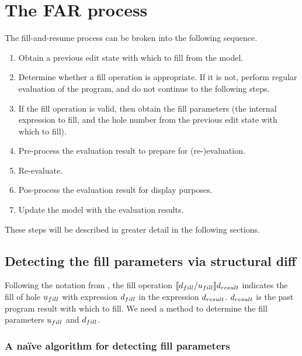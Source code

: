 \section{The FAR process}
\label{sec:far-process}

The fill-and-resume process can be broken into the following sequence.

\begin{enumerate}
\item Obtain a previous edit state with which to fill from the model.
\item Determine whether a fill operation is appropriate. If it is not, perform regular evaluation of the program, and do not continue to the following steps.
\item If the fill operation is valid, then obtain the fill parameters (the internal expression to fill, and the hole number from the previous edit state with which to fill).
\item Pre-process the evaluation result to prepare for (re-)evaluation.
\item Re-evaluate.
\item Pos-process the evaluation result for display purposes.
\item Update the model with the evaluation results.
\end{enumerate}

These steps will be described in greater detail in the following sections.

\subsection{Detecting the fill parameters via structural diff}
\label{sec:obtaining-fill-parameters}

Following the notation from \cite{conf/popl/HazelnutLive19}, the fill operation $\llbracket{}d_{fill}/u_{fill}\rrbracket{}d_{result}$ indicates the fill of hole $u_{fill}$ with expression $d_{fill}$ in the expression $d_{result}$. $d_{result}$ is the past program result with which to fill. We need a method to determine the fill parameters $u_{fill}$ and $d_{fill}$.

\subsubsection{A na\"ive algorithm for detecting fill parameters}
\label{sec:far-detect-naive}

